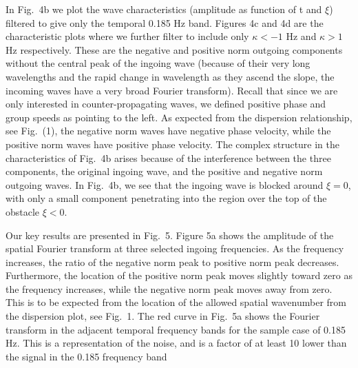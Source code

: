 \documentclass[12pt,aps%
]{revtex4}
\begin{document}
In Fig.\ 4b we plot the wave characteristics (amplitude as function of t and
$\xi$)
filtered to give only the temporal 0.185 Hz band. Figures 4c and 4d are the
characteristic plots where we further filter to include only $\kappa < -1$ Hz
and $\kappa >
1$ Hz respectively. These are the negative and positive norm outgoing
components without the central peak of the ingoing wave (because of their very
long wavelengths and the rapid change in wavelength as they ascend the slope,
the incoming waves have a very broad Fourier transform). Recall that since we
are only interested in counter-propagating waves, we defined positive phase
and group speeds as pointing to the left. As expected from the dispersion
relationship, see Fig.\ (1), the negative norm waves have negative phase
velocity, while the positive norm waves have positive phase velocity. The
complex structure in the characteristics of Fig.\ 4b arises because of the
interference between the three components, the original ingoing wave, and the
positive and negative norm outgoing waves. In Fig.\ 4b, we see that the ingoing
wave is blocked around $\xi= 0$, with only a small component penetrating into the
region over the top of the obstacle $\xi < 0$.

Our key results are presented in Fig.\ 5. Figure 5a shows the amplitude of the
spatial Fourier transform at three selected ingoing frequencies. As the
frequency increases, the ratio of the negative norm peak to positive norm peak
decreases. Furthermore, the location of the positive norm peak moves slightly
toward zero as the frequency increases, while the negative norm peak moves
away from zero. This is to be expected from the location of the allowed
spatial wavenumber from the dispersion plot, see Fig.\ 1. The red curve in
Fig.\ 5a
 shows the Fourier transform in the adjacent temporal frequency bands for
the sample case of 0.185 Hz. This is a representation of the noise, and is a
factor of at least 10 lower than the signal in the 0.185 frequency band
\end{document}

